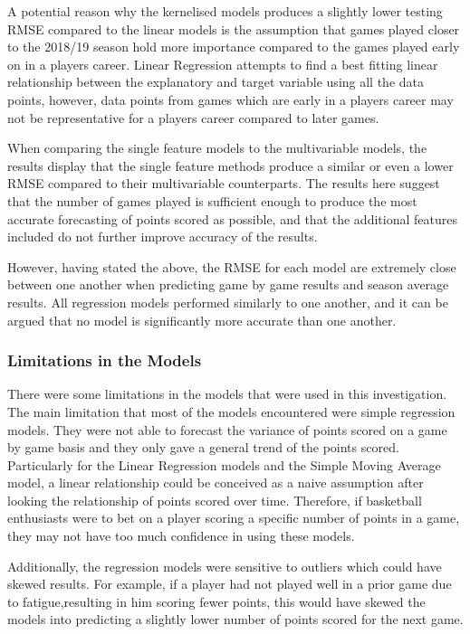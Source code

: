 \documentclass[a4paper,11pt,twoside]{article}
\begin{document}
A potential reason why the kernelised models produces a slightly lower testing RMSE compared to the linear models is the assumption that games played closer to the 2018/19 season hold more importance compared to the games played early on in a players career. Linear Regression attempts to find a best fitting linear relationship between the explanatory and target variable using all the data points, however, data points from games which are early in a players career may not be representative for a players career compared to later games.

When comparing the single feature models to the multivariable models, the results display that the single feature methods produce a similar or even a lower RMSE compared to their multivariable counterparts. The results here suggest that the number of games played is sufficient enough to produce the most accurate forecasting of points scored as possible, and that the additional features included do not further improve accuracy of the results.

However, having stated the above, the RMSE for each model are extremely close between one another when predicting game by game results and season average results. All regression models performed similarly to one another, and it  can be argued that no model is significantly more accurate than one another.

\subsubsection{Limitations in the Models}

There were some limitations in the models that were used in this investigation. The main limitation that most of the models encountered were simple regression models. They were not able to forecast the variance of points scored on a game by game basis and they only gave a general trend of the points scored. Particularly for the Linear Regression models and the Simple Moving Average model, a linear relationship could be conceived as a naive assumption after looking the relationship of points scored over time. Therefore, if basketball enthusiasts were to bet on a player scoring a specific number of points in a game, they may not have too much confidence in using these models.

Additionally, the regression models were sensitive to outliers which could have skewed results. For example, if a player had not played well in a prior game due to fatigue,resulting in him scoring fewer points, this would have skewed the models into predicting a slightly lower number of points scored for the next game.
\end{document}
